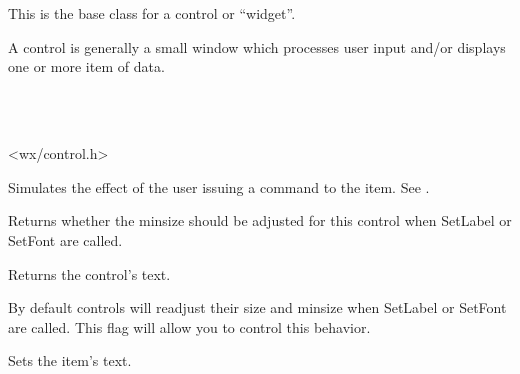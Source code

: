 \section{}\label{wxcontrol}

This is the base class for a control or ``widget''.

A control is generally a small window which processes user input and/or
displays one or more item of data.


\\
\\


<wx/control.h>





\label{wxcontrolcommand}


Simulates the effect of the user issuing a command to the item. See .


\label{wxcontrolgetadjustminsizeflag}


Returns whether the minsize should be adjusted for this control when
SetLabel or SetFont are called.


\label{wxcontrolgetlabel}


Returns the control's text.


\label{wxcontrolsetadjustminsizeflag}


By default controls will readjust their size and minsize when
SetLabel or SetFont are called.  This flag will allow you to
control this behavior.

\label{wxcontrolsetlabel}


Sets the item's text.

